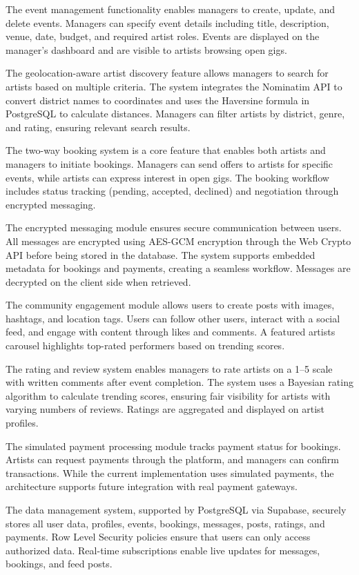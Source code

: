 \documentclass[12pt,a4paper]{report}
\begin{document}
The event management functionality enables managers to create, update, and delete events. Managers can specify event details including title, description, venue, date, budget, and required artist roles. Events are displayed on the manager's dashboard and are visible to artists browsing open gigs.

The geolocation-aware artist discovery feature allows managers to search for artists based on multiple criteria. The system integrates the Nominatim API to convert district names to coordinates and uses the Haversine formula in PostgreSQL to calculate distances. Managers can filter artists by district, genre, and rating, ensuring relevant search results.

The two-way booking system is a core feature that enables both artists and managers to initiate bookings. Managers can send offers to artists for specific events, while artists can express interest in open gigs. The booking workflow includes status tracking (pending, accepted, declined) and negotiation through encrypted messaging.

The encrypted messaging module ensures secure communication between users. All messages are encrypted using AES-GCM encryption through the Web Crypto API before being stored in the database. The system supports embedded metadata for bookings and payments, creating a seamless workflow. Messages are decrypted on the client side when retrieved.

The community engagement module allows users to create posts with images, hashtags, and location tags. Users can follow other users, interact with a social feed, and engage with content through likes and comments. A featured artists carousel highlights top-rated performers based on trending scores.

The rating and review system enables managers to rate artists on a 1--5 scale with written comments after event completion. The system uses a Bayesian rating algorithm to calculate trending scores, ensuring fair visibility for artists with varying numbers of reviews. Ratings are aggregated and displayed on artist profiles.

The simulated payment processing module tracks payment status for bookings. Artists can request payments through the platform, and managers can confirm transactions. While the current implementation uses simulated payments, the architecture supports future integration with real payment gateways.

The data management system, supported by PostgreSQL via Supabase, securely stores all user data, profiles, events, bookings, messages, posts, ratings, and payments. Row Level Security policies ensure that users can only access authorized data. Real-time subscriptions enable live updates for messages, bookings, and feed posts.
\end{document}
